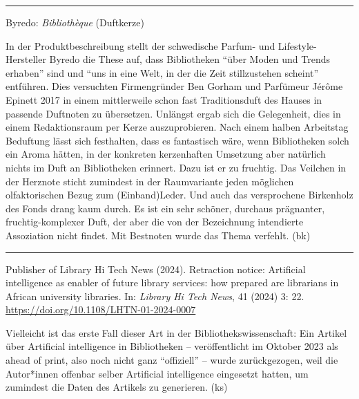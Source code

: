 \documentclass[a4paper,
fontsize=11pt,
oneside,
numbers=noperiodatend,
parskip=half-,
bibliography=totoc,
final
]{scrartcl}
\begin{document}
\begin{center}\rule{0.5\linewidth}{0.5pt}\end{center}

Byredo: \emph{Bibliothèque} (Duftkerze)

In der Produktbeschreibung stellt der schwedische Parfum- und
Lifestyle-Hersteller Byredo die These auf, dass Bibliotheken
\enquote{über Moden und Trends erhaben} sind und \enquote{uns in eine
Welt, in der die Zeit stillzustehen scheint} entführen. Dies versuchten
Firmengründer Ben Gorham und Parfümeur Jérôme Epinett 2017 in einem
mittlerweile schon fast Traditionsduft des Hauses in passende Duftnoten
zu übersetzen. Unlängst ergab sich die Gelegenheit, dies in einem
Redaktionsraum per Kerze auszuprobieren. Nach einem halben Arbeitstag
Beduftung lässt sich festhalten, dass es fantastisch wäre, wenn
Bibliotheken solch ein Aroma hätten, in der konkreten kerzenhaften
Umsetzung aber natürlich nichts im Duft an Bibliotheken erinnert. Dazu
ist er zu fruchtig. Das Veilchen in der Herznote sticht zumindest in der
Raumvariante jeden möglichen olfaktorischen Bezug zum (Einband)Leder.
Und auch das versprochene Birkenholz des Fonds drang kaum durch. Es ist
ein sehr schöner, durchaus prägnanter, fruchtig-komplexer Duft, der aber
die von der Bezeichnung intendierte Assoziation nicht findet. Mit
Bestnoten wurde das Thema verfehlt. (bk)

\begin{center}\rule{0.5\linewidth}{0.5pt}\end{center}

Publisher of Library Hi Tech News (2024). Retraction notice: Artificial
intelligence as enabler of future library services: how prepared are
librarians in African university libraries. In: \emph{Library Hi Tech
News}, 41 (2024) 3: 22. \url{https://doi.org/10.1108/LHTN-01-2024-0007}

Vielleicht ist das erste Fall dieser Art in der Bibliothekswissenschaft:
Ein Artikel über Artificial intelligence in Bibliotheken --
veröffentlicht im Oktober 2023 als ahead of print, also noch nicht ganz
\enquote{offiziell} -- wurde zurückgezogen, weil die Autor*innen
offenbar selber Artificial intelligence eingesetzt hatten, um zumindest
die Daten des Artikels zu generieren. (ks)

\end{document}

